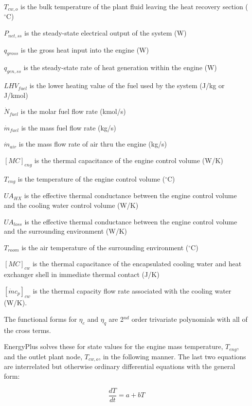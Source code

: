 \({T_{cw,o}}\) is the bulk temperature of the plant fluid leaving the heat recovery section (\(^{\circ}\)C)

\({P_{net,ss}}\) is the steady-state electrical output of the system (W)

\({q_{gross}}\) is the gross heat input into the engine (W)

\({q_{gen,ss}}\) is the steady-state rate of heat generation within the engine (W)

\(LH{V_{fuel}}\) is the lower heating value of the fuel used by the system (J/kg or J/kmol)

\({\dot N_{fuel}}\) is the molar fuel flow rate (kmol/s)

\({\dot m_{fuel}}\) is the mass fuel flow rate (kg/s)

\({\dot m_{air}}\) is the mass flow rate of air thru the engine (kg/s)

\({[MC]_{eng}}\) is the thermal capacitance of the engine control volume (W/K)

\({T_{eng}}\) is the temperature of the engine control volume (\(^{\circ}\)C)

\(U{A_{HX}}\) is the effective thermal conductance between the engine control volume and the cooling water control volume (W/K)

\(U{A_{loss}}\) is the effective thermal conductance between the engine control volume and the surrounding environment (W/K)

\({T_{room}}\) is the air temperature of the surrounding environment (\(^{\circ}\)C)

\({[MC]_{cw}}\) is the thermal capacitance of the encapsulated cooling water and heat exchanger shell in immediate thermal contact (J/K)

\({[\dot m{c_p}]_{cw}}\) is the thermal capacity flow rate associated with the cooling water (W/K).

The functional forms for \({\eta_e}\) and \({\eta_q}\) are 2\(^{nd}\) order trivariate polynomials with all of the cross terms.

EnergyPlus solves these for state values for the engine mass temperature, \({T_{eng}}\), and the outlet plant node, \({T_{cw,o}}\), in the following manner. The last two equations are interrelated but otherwise ordinary differential equations with the general form:

\begin{equation}
\frac{{dT}}{{dt}} = a + bT
\end{equation}

